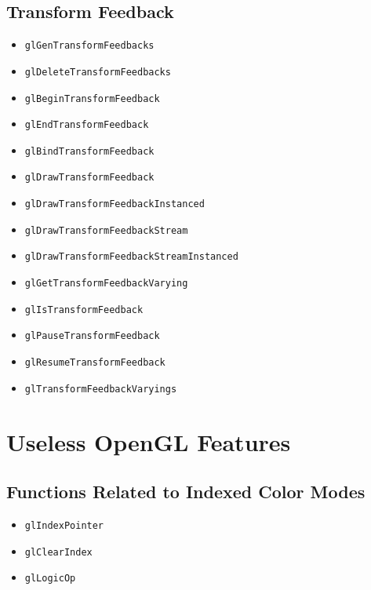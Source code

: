 \documentclass[12pt]{article}
\begin{document}
\subsection{Transform Feedback}
\begin{itemize}
\item \texttt{glGenTransformFeedbacks}
\item \texttt{glDeleteTransformFeedbacks}
\item \texttt{glBeginTransformFeedback}
\item \texttt{glEndTransformFeedback}
\item \texttt{glBindTransformFeedback}
\item \texttt{glDrawTransformFeedback}
\item \texttt{glDrawTransformFeedbackInstanced}
\item \texttt{glDrawTransformFeedbackStream}
\item \texttt{glDrawTransformFeedbackStreamInstanced}
\item \texttt{glGetTransformFeedbackVarying}
\item \texttt{glIsTransformFeedback}
\item \texttt{glPauseTransformFeedback}
\item \texttt{glResumeTransformFeedback}
\item \texttt{glTransformFeedbackVaryings}
\end{itemize}

\section{Useless OpenGL Features}

\subsection{Functions Related to Indexed Color Modes}
\begin{itemize}
\item \texttt{glIndexPointer}
\item \texttt{glClearIndex}
\item \texttt{glLogicOp}
\end{itemize}
\end{document}
